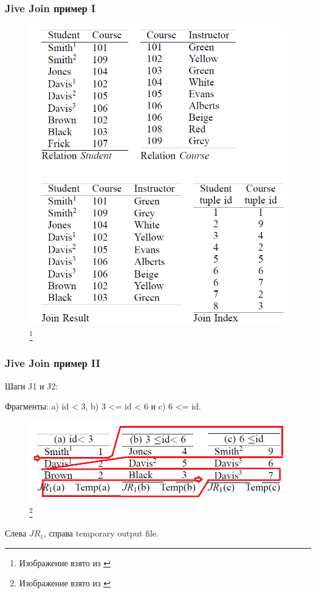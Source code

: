 \documentclass{beamer}
\begin{document}
\begin{frame}
\frametitle{Jive Join пример I}

\begin{figure}[htb]
\includegraphics[width=\textwidth,height=0.800\textheight,keepaspectratio]{jive-start.png} 
\footnote{\tiny{Изображение взято из \cite{Li1999}}}
\end{figure}   

\end{frame}

\begin{frame}
\frametitle{Jive Join пример II}

Шаги J1 и J2:

Фрагменты: a) id < 3, b) 3 <= id < 6 и c) 6 <= id.

\begin{figure}[htb]
\includegraphics[width=\textwidth,height=0.800\textheight,keepaspectratio]{jive-1.png} 
\footnote{\tiny{Изображение взято из \cite{Li1999}}}
\end{figure}

Слева $JR_1$, справа temporary output file.

\end{frame}
\end{document}
